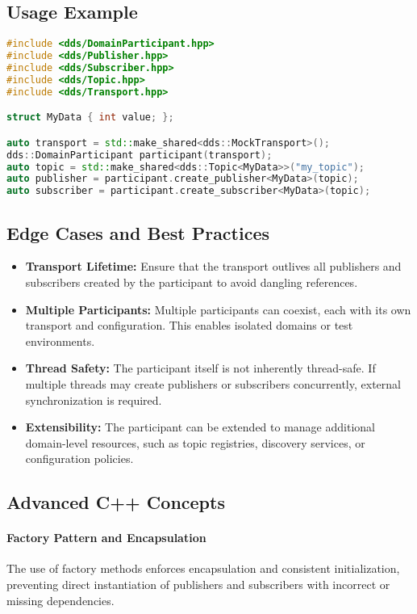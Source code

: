 \documentclass[12pt]{report}
\begin{document}
\subsection{Usage Example}
\begin{lstlisting}[language=C++]
#include <dds/DomainParticipant.hpp>
#include <dds/Publisher.hpp>
#include <dds/Subscriber.hpp>
#include <dds/Topic.hpp>
#include <dds/Transport.hpp>

struct MyData { int value; };

auto transport = std::make_shared<dds::MockTransport>();
dds::DomainParticipant participant(transport);
auto topic = std::make_shared<dds::Topic<MyData>>("my_topic");
auto publisher = participant.create_publisher<MyData>(topic);
auto subscriber = participant.create_subscriber<MyData>(topic);
\end{lstlisting}

\subsection{Edge Cases and Best Practices}
\begin{itemize}
    \item \textbf{Transport Lifetime:} Ensure that the transport outlives all publishers and subscribers created by the participant to avoid dangling references.
    \item \textbf{Multiple Participants:} Multiple participants can coexist, each with its own transport and configuration. This enables isolated domains or test environments.
    \item \textbf{Thread Safety:} The participant itself is not inherently thread-safe. If multiple threads may create publishers or subscribers concurrently, external synchronization is required.
    \item \textbf{Extensibility:} The participant can be extended to manage additional domain-level resources, such as topic registries, discovery services, or configuration policies.
\end{itemize}

\subsection{Advanced C++ Concepts}
\paragraph{Factory Pattern and Encapsulation}
The use of factory methods enforces encapsulation and consistent initialization, preventing direct instantiation of publishers and subscribers with incorrect or missing dependencies.
\end{document}
